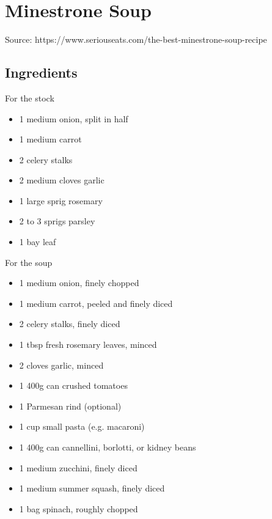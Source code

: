 \section{Minestrone Soup}


Source: https://www.seriouseats.com/the-best-minestrone-soup-recipe

\subsection{Ingredients}

\begin{multicols}{2}
    For the stock

    \begin{itemize}
        \item 1 medium onion, split in half
        \item 1 medium carrot
        \item 2 celery stalks
        \item 2 medium cloves garlic
        \item 1 large sprig rosemary
        \item 2 to 3 sprigs parsley
        \item 1 bay leaf
    \end{itemize}

    \vfill\null
    \columnbreak

    For the soup

    \begin{itemize}
        \item 1 medium onion, finely chopped
        \item 1 medium carrot, peeled and finely diced
        \item 2 celery stalks, finely diced
        \item 1 tbsp fresh rosemary leaves, minced
        \item 2 cloves garlic, minced
        \item 1 400g can crushed tomatoes
        \item 1 Parmesan rind (optional)
        \item 1 cup small pasta (e.g. macaroni)
        \item 1 400g can cannellini, borlotti, or kidney beans
        \item 1 medium zucchini, finely diced
        \item 1 medium summer squash, finely diced
        \item 1 bag spinach, roughly chopped
    \end{itemize}
\end{multicols}

